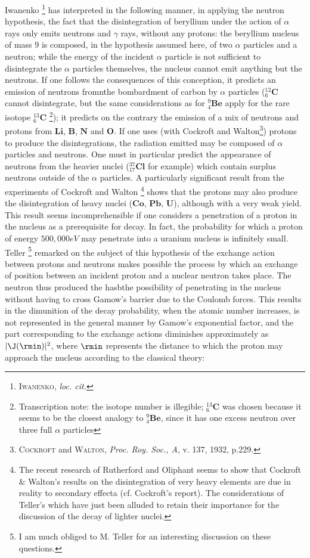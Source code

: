 \documentclass{article}
\newcommand{\element}[1]{\textbf{#1}}
\newcommand{\isotope}[3]{
{{}^{#3}_{#2}\element{#1}}
}
\newcommand{\unit}[1]{#1}
\begin{document}
Iwanenko \footnote{\textsc{Iwanenko}, \textit{loc. cit.}} has interpreted in the following manner, in applying the neutron hypothesis, the fact that the disintegration of beryllium under the action of $\alpha$ rays only emits neutrons and $\gamma$ rays, without any protons: the beryllium nucleus of mass 9 is composed, in the hypothesis assumed here, of two $\alpha$ particles and a neutron; while the energy of the incident $\alpha$ particle is not sufficient to disintegrate the $\alpha$ particles themselves, the nucleus cannot emit anything but the neutrons. If one follows the consequences of this conception, it predicts an emission of neutrons fromnthe bombardment of carbon by $\alpha$ particles ($\isotope{C}{6}{12}$ cannot disintegrate, but the same considerations as for $\isotope{Be}{4}{9}$ apply for the rare isotope $\isotope{C}{6}{13}$ \footnote{Transcription note: the isotope number is illegible; $\isotope{C}{6}{13}$ was chosen because it seems to be the closest analogy to $\isotope{Be}{4}{9}$, since it has one excess neutron over three full $\alpha$ particles}); it predicts on the contrary the emission of a mix of neutrons and protons from $\element{Li}$, $\element{B}$, $\element{N}$ and $\element{O}$. If one uses (with Cockroft and Walton\footnote{\textsc{Cockroft} and \textsc{Walton}, \textit{Proc. Roy. Soc., A}, v. 137, 1932, p.229.}) protons to produce the disintegrations, the radiation emitted may be composed of $\alpha$ particles and neutrons. One must in particular predict the appearance of neutrons from the heavier nuclei ($\isotope{Cl}{17}{37}$ for example) which contain surplus neutrons outside of the $\alpha$ particles.
A particularly significant result from the experiments of Cockroft and Walton \footnote{The recent research of Rutherford and Oliphant seems to show that Cockroft \& Walton's results on the disintegration of very heavy elements are due in reality to secondary effecta (cf. Cockroft's report). The considerations of Teller's which have just been alluded to retain their importance for the discussion of the decay of lighter nuclei. } shows that the protons may also produce the disintegration of heavy nuclei ($\element{Co}$, $\element{Pb}$, $\element{U}$), although with a very weak yield. This result seems incomprehensible if one considers a penetration of a proton in the nucleus as a prerequisite for decay. In fact, the probability for which a proton of energy $500,000\unit{eV}$ may penetrate into a uranium nucleus is infinitely small. Teller \footnote{I am much obliged to M. Teller for an interesting discussion on these questions.} remarked on the subject of this hypothesis of the exchange action between protons and neutrons makes possible the process by which an exchange of position between an incident proton and a nuclear neutron takes place. The neutron thus produced the hasbthe possibility of penetrating in the nucleus without having to cross Gamow's barrier due to the Coulomb forces. This results in the dimunition of the decay probability, when the atomic number increases, is not represented in the general manner by Gamow's exponential factor, and the part corresponding to the exchange actions diminishes approximately as $|\J(\rmin)|^2$, where $\rmin$ represents the distance to which the proton may approach the nucleus according to the classical theory:
\end{document}
